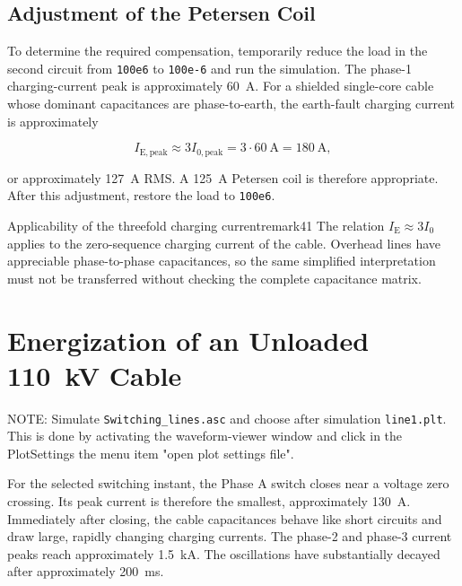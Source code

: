 \subsection{Adjustment of the Petersen Coil}
\label{sec:petersen-adjustment}

To determine the required compensation, temporarily reduce the load in the
second circuit from \texttt{100e6} to \texttt{100e-6} and run the simulation.
The phase-1 charging-current peak is approximately \SI{60}{\ampere}. For a
shielded single-core cable whose dominant capacitances are phase-to-earth, the
earth-fault charging current is approximately

\begin{equation}
I_{\mathrm{E,peak}}\approx 3I_{0,\mathrm{peak}}
 =3\cdot\SI{60}{\ampere}=\SI{180}{\ampere},
\end{equation}

or approximately \SI{127}{\ampere} RMS. A \SI{125}{\ampere} Petersen coil is
therefore appropriate. After this adjustment, restore the load to
\texttt{100e6}.

\begin{remark}{Applicability of the threefold charging current}{remark41}
The relation $I_{\mathrm E}\approx3I_0$ applies to the zero-sequence charging
current of the cable. Overhead lines have appreciable phase-to-phase
capacitances, so the same simplified interpretation must not be transferred
without checking the complete capacitance matrix.
\end{remark}

\section{Energization of an Unloaded \SI{110}{\kilo\volt} Cable}
\label{sec:section43}
NOTE: Simulate \texttt{Switching\_lines.asc} and choose after simulation \texttt{line1.plt}.
This is done by activating the waveform-viewer window and click in the PlotSettings the menu item "open plot settings file".
 
For the selected switching instant, the Phase A switch closes near a voltage zero crossing. Its peak current is therefore the smallest, approximately
\SI{130}{\ampere}. Immediately after closing, the cable capacitances behave
like short circuits and draw large, rapidly changing charging currents. The
phase-2 and phase-3 current peaks reach approximately \SI{1.5}{\kilo\ampere}.
The oscillations have substantially decayed after approximately
\SI{200}{\milli\second}.

